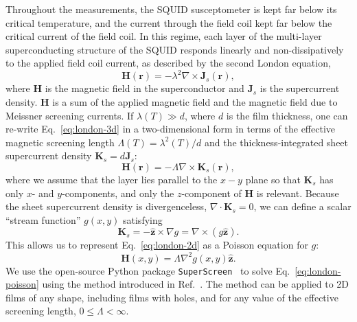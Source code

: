 \documentclass[%
 reprint,
 superscriptaddress,
 amsmath,
 amssymb,
 amsfonts,
 aps,
 prb,
]{revtex4-2}
\begin{document}
Throughout the measurements, the SQUID susceptometer is kept far below its critical temperature, and the current through the field coil kept far below the critical current of the field coil. In this regime, each layer of the multi-layer superconducting structure of the SQUID responds linearly and non-dissipatively to the applied field coil current, as described by the second London equation,
\begin{equation}
    \label{eq:london-3d}
    \mathbf{H}(\mathbf{r})=-\lambda^2\nabla\times\mathbf{J}_s(\mathbf{r}),
\end{equation}
where $\mathbf{H}$ is the magnetic field in the superconductor and $\mathbf{J}_s$ is the supercurrent density. $\mathbf{H}$ is a sum of the applied magnetic field and the magnetic field due to Meissner screening currents. If $\lambda(T)\gg d$, where $d$ is the film thickness, one can re-write Eq.~\ref{eq:london-3d} in a two-dimensional form in terms of the effective magnetic screening length $\Lambda(T)=\lambda^2(T)/d$ and the thickness-integrated sheet supercurrent density $\mathbf{K}_s=d\mathbf{J}_s$:
\begin{equation}
    \label{eq:london-2d}
    \mathbf{H}(\mathbf{r})=-\Lambda\nabla\times\mathbf{K}_s(\mathbf{r}),
\end{equation}
where we assume that the layer lies parallel to the $x-y$ plane so that $\mathbf{K}_s$ has only $x$- and $y$-components, and only the $z$-component of $\mathbf{H}$ is relevant. Because the sheet supercurrent density is divergenceless, $\nabla\cdot\mathbf{K}_s=0$, we can define a scalar ``stream function'' $g(x, y)$ satisfying
\begin{equation}
    \label{eq:stream}
    \mathbf{K}_s=-\hat{\mathbf{z}}\times\nabla g=\nabla\times(g\hat{\mathbf{z}}).
\end{equation}
This allows us to represent Eq.~\ref{eq:london-2d} as a Poisson equation for $g$:
\begin{equation}
    \label{eq:london-poisson}
    \mathbf{H}(x, y)=\Lambda\nabla^2g(x, y)\hat{\mathbf{z}}.
\end{equation}
We use the open-source Python package \texttt{SuperScreen}~\cite{Bishop-Van_Horn2022-sy} to solve Eq.~\ref{eq:london-poisson} using the method introduced in Ref.~\cite{Brandt2005-wj}. The method can be applied to 2D films of any shape, including films with holes, and for any value of the effective screening length, $0\leq\Lambda<\infty$.
\end{document}
